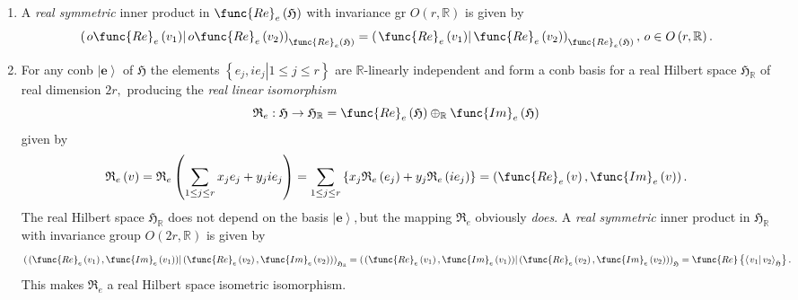 \documentclass[aps,preprint]{revtex4}
\begin{document}
\begin{enumerate}
\item A \emph{real symmetric} inner product in $\func{Re}_{e}\left( 
\mathfrak{H}\right) $ with invariance gr $O\left( r,\mathbb{R}\right) $ is
given by 
\begin{equation}
\left( \left. o\func{Re}_{e}\left( v_{1}\right) \right\vert o\func{Re}%
_{e}\left( v_{2}\right) \right) _{\func{Re}_{e}\left( \mathfrak{H}\right)
}=\left( \left. \func{Re}_{e}\left( v_{1}\right) \right\vert \func{Re}%
_{e}\left( v_{2}\right) \right) _{\func{Re}_{e}\left( \mathfrak{H}\right)
},\,o\in O\left( r,\mathbb{R}\right) .
\end{equation}

\item For any conb $\left\vert \mathbf{e}\right\rangle $ of $\mathfrak{H}$
the elements $\left\{ \left. e_{j},ie_{j}\right\vert 1\leq j\leq r\right\} $
are $\mathbb{R}$-linearly independent and form a conb basis for a real
Hilbert space $\mathfrak{H}_{\mathbb{R}}$ of real dimension $2r,$ producing
the \emph{real linear} \emph{isomorphism} 
\begin{equation}
\mathfrak{R}_{e}:\mathfrak{H\rightarrow H}_{\mathbb{R}}=\func{Re}_{e}\left( 
\mathfrak{H}\right) \oplus _{\mathbb{R}}\func{Im}_{e}\left( \mathfrak{H}%
\right)
\end{equation}%
given by 
\begin{equation}
\mathfrak{R}_{e}\left( v\right) =\mathfrak{R}_{e}\left( \sum_{1\leq j\leq
r}x_{j}e_{j}+y_{j}ie_{j}\right) =\sum_{1\leq j\leq r}\left\{ x_{j}\mathfrak{R%
}_{e}\left( e_{j}\right) +y_{j}\mathfrak{R}_{e}\left( ie_{j}\right) \right\}
=\left( \func{Re}_{e}\left( v\right) ,\func{Im}_{e}\left( v\right) \right) .
\end{equation}%
The real Hilbert space $\mathfrak{H}_{\mathbb{R}}$ does not depend on the
basis $\left\vert \mathbf{e}\right\rangle ,$but the mapping $\mathfrak{R}%
_{e} $ obviously \emph{does}. A \emph{real symmetric} inner product in $%
\mathfrak{H}_{\mathbb{R}}$ with invariance group $O\left( 2r,\mathbb{R}%
\right) $ is given by 
\begin{equation}
\left( \left. \left( \func{Re}_{e}\left( v_{1}\right) ,\func{Im}_{e}\left(
v_{1}\right) \right) \right\vert \left( \func{Re}_{e}\left( v_{2}\right) ,%
\func{Im}_{e}\left( v_{2}\right) \right) \right) _{\mathfrak{H}_{\mathbb{R}%
}}=\left( \left. \left( \func{Re}_{e}\left( v_{1}\right) ,\func{Im}%
_{e}\left( v_{1}\right) \right) \right\vert \left( \func{Re}_{e}\left(
v_{2}\right) ,\func{Im}_{e}\left( v_{2}\right) \right) \right) _{\mathfrak{H}%
}=\func{Re}\left\{ \left\langle \left. v_{1}\right\vert v_{2}\right\rangle _{%
\mathfrak{H}}\right\} .
\end{equation}%
This makes $\mathfrak{R}_{e}$ a real Hilbert space isometric isomorphism.


\end{enumerate}
\end{document}
